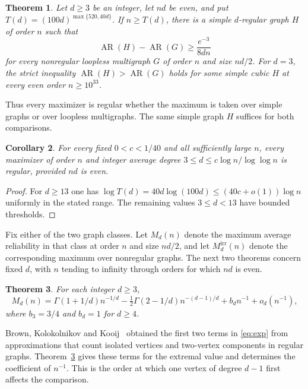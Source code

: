 \documentclass[11pt,reqno]{amsart}
\newtheorem{theorem}{Theorem}[section]
\newtheorem{corollary}[theorem]{Corollary}
\theoremstyle{remark}
\numberwithin{equation}{section}
\newcommand{\AR}{\operatorname{AR}}
\begin{document}
\begin{theorem}\label{thm:main}
Let $d\ge3$ be an integer, let $nd$ be even, and put $T(d)=(100d)^{\max\{520,40d\}}$. If $n\ge T(d)$, there is a simple $d$-regular graph $H$ of order $n$ such that
\begin{equation}\label{eq:gap}
  \AR(H)-\AR(G)\ge \frac{e^{-3}}{8dn}
\end{equation}
for every nonregular loopless multigraph $G$ of order $n$ and size $nd/2$. For $d=3$, the strict inequality $\AR(H)>\AR(G)$ holds for some simple cubic $H$ at every even order $n\ge10^{33}$.
\end{theorem}

Thus every maximizer is regular whether the maximum is taken over simple graphs or over loopless multigraphs. The same simple graph $H$ suffices for both comparisons.
\begin{corollary}\label{cor:uniform}
For every fixed $0<c<1/40$ and all sufficiently large $n$, every maximizer of order $n$ and integer average degree $3\le d\le c\log n/\log\log n$ is regular, provided $nd$ is even.
\end{corollary}
\begin{proof}
For $d\ge13$ one has $\log T(d)=40d\log(100d)\le(40c+o(1))\log n$ uniformly in the stated range. The remaining values $3\le d<13$ have bounded thresholds.
\end{proof}

Fix either of the two graph classes. Let $M_d(n)$ denote the maximum average reliability in that class at order $n$ and size $nd/2$, and let $M_d^{\mathrm{irr}}(n)$ denote the corresponding maximum over nonregular graphs. The next two theorems concern fixed $d$, with $n$ tending to infinity through orders for which $nd$ is even.
\begin{theorem}\label{thm:exp}
For each integer $d\ge3$,
\begin{equation}\label{eq:exp}
 M_d(n)=\Gamma(1+1/d)n^{-1/d}
 -\tfrac12\Gamma(2-1/d)n^{-(d-1)/d}
 +b_d n^{-1}+o_d(n^{-1}),
\end{equation}
where $b_3=3/4$ and $b_d=1$ for $d\ge4$.
\end{theorem}
Brown, Kolokolnikov and Kooij~\cite[Section~3.2]{BKK} obtained the first two terms in \eqref{eq:exp} from approximations that count isolated vertices and two-vertex components in regular graphs. Theorem~\ref{thm:exp} gives these terms for the extremal value and determines the coefficient of $n^{-1}$. This is the order at which one vertex of degree $d-1$ first affects the comparison.
\end{document}
